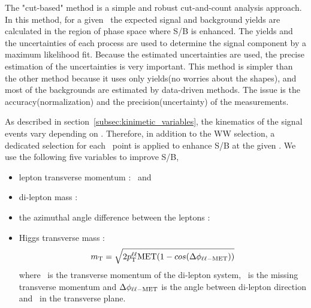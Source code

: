 The "cut-based" method is a simple and robust cut-and-count analysis approach. 
In this method, for a given \mHi\ the expected signal and background yields are 
calculated in the region of phase space where S/B is enhanced. 
The yields and the uncertainties of each process are used to determine 
the signal component by a maximum likelihood fit. 
Because the estimated uncertainties are used, the precise estimation
of the uncertainties is very important.  
This method is simpler than the other method because it uses only 
yields(no worries about the shapes), 
and most of the backgrounds are estimated by data-driven methods. 
The issue is the accuracy(normalization) and the precision(uncertainty) of the measurements.  

As described in section~\ref{subsec:kinimetic_variables}, the kinematics of 
the signal events vary depending on \mHi. Therefore, 
in addition to the WW selection, a dedicated selection 
for each \mHi\ point is applied to enhance S/B at the given \mHi. 
We use the following five variables to improve S/B, 
\begin{itemize}
\item lepton transverse momentum : \ptlmax\ and \ptlmin
\item di-lepton mass : \mll 
\item the azimuthal angle difference between the leptons : \delphill
\item Higgs transverse mass : 
\begin{eqnarray} 
m_{\mathrm{T}} = \sqrt{2p_\mathrm{T}^{\ell\ell}\mathrm{MET}(1-cos(\Delta\phi_{\ell\ell-\mathrm{MET}}))}
\end{eqnarray} 
where \ptll\ is the transverse momentum of the di-lepton system,
\met\ is the missing transverse momentum and
$\Delta\phi_{\ell\ell-\mathrm{MET}}$ is the angle between di-lepton
direction and \met\ in the transverse plane.
\end{itemize}

